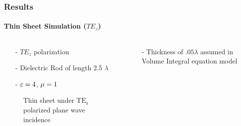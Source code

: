 \documentclass[mathserif,18pt,xcolor=table]{beamer}
\begin{document}
\begin{frame}
  \frametitle{Results}
  \framesubtitle{Thin Sheet Simulation ($TE_z$)}
  \begin{columns}[T] %
    \begin{column}{.5\textwidth}
      \begin{itemize}
        \item[-]{$TE_z$ polarization}
        \item[-]{Dielectric Rod of length 2.5 $\lambda$}
        \item[-]{$\varepsilon = 4$, $\mu = 1$}
      \end{itemize}
      \begin{figure}[h]
        \normalsize
        \centering
        
        \caption{Thin sheet under $\mathrm{TE_z}$ polarized plane wave incidence}
        \label{fig:te_plate}
      \end{figure}
    \end{column}
    \begin{column}[T]{.5\textwidth}
      \begin{figure}
        \vspace*{-2cm}
        
        \label{fig:TE_rcs}
      \end{figure}
      \begin{itemize}
        \item[-]{Thickness of $.05 \lambda$ assumed in Volume Integral equation model}
      \end{itemize}
      \end{column}%
  \end{columns}
\end{frame}
\end{document}
